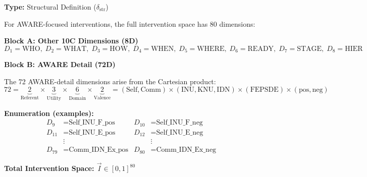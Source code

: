 \begin{tcolorbox}[colback=blue!5!white, colframe=blue!75!black,
    title=\textbf{Definition EIT-EMP-1-D3: The 80D Awareness Intervention Space}]

\textbf{Type:} Structural Definition ($\delta_{\text{str}}$)

For AWARE-focused interventions, the full intervention space has 80 dimensions:

\textbf{Block A: Other 10C Dimensions (8D)}
\begin{equation}
D_1 = \text{WHO}, \; D_2 = \text{WHAT}, \; D_3 = \text{HOW}, \; D_4 = \text{WHEN}, \; D_5 = \text{WHERE}, \; D_6 = \text{READY}, \; D_7 = \text{STAGE}, \; D_8 = \text{HIER}
\end{equation}

\textbf{Block B: AWARE Detail (72D)}

The 72 AWARE-detail dimensions arise from the Cartesian product:
\begin{equation}
72 = \underbrace{2}_{\text{Referent}} \times \underbrace{3}_{\text{Utility}} \times \underbrace{6}_{\text{Domain}} \times \underbrace{2}_{\text{Valence}} = (\text{Self}, \text{Comm}) \times (\text{INU}, \text{KNU}, \text{IDN}) \times (\text{FEPSDE}) \times (\text{pos}, \text{neg})
\end{equation}

\textbf{Enumeration (examples):}
\begin{align*}
D_9 &= \text{Self\_INU\_F\_pos} & D_{10} &= \text{Self\_INU\_F\_neg} \\
D_{11} &= \text{Self\_INU\_E\_pos} & D_{12} &= \text{Self\_INU\_E\_neg} \\
&\vdots & &\vdots \\
D_{79} &= \text{Comm\_IDN\_Ex\_pos} & D_{80} &= \text{Comm\_IDN\_Ex\_neg}
\end{align*}

\textbf{Total Intervention Space: $\vec{I} \in [0,1]^{80}$}

\end{tcolorbox}

